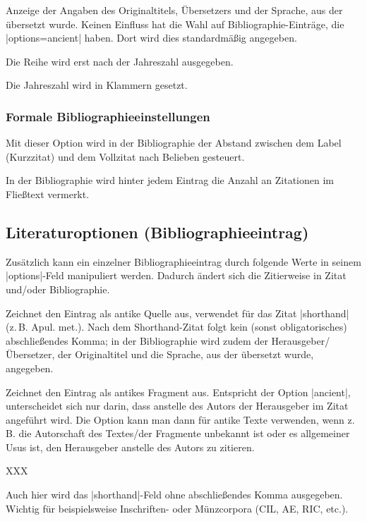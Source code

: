 \documentclass[a4paper,10pt,ngerman]{ltxdoc}
\begin{document}
  Anzeige der Angaben des Originaltitels, Übersetzers und der Sprache, aus der übersetzt wurde. 
Keinen Einfluss hat die Wahl auf Bibliographie-Einträge, die |options=ancient| haben. 
Dort wird dies standardmäßig angegeben.

  Die Reihe wird erst nach der Jahreszahl ausgegeben.
 
  Die Jahreszahl wird in Klammern gesetzt.

\subsubsection{Formale Bibliographieeinstellungen}

  Mit dieser Option wird in der Bibliographie der Abstand zwischen dem Label (Kurzzitat) und dem Vollzitat nach Belieben gesteuert.
 
  In der Bibliographie wird hinter jedem Eintrag die Anzahl an Zitationen im Fließtext vermerkt. 

\subsection{Literaturoptionen (Bibliographieeintrag)}\label{bib_options}
Zusätzlich kann ein einzelner Bibliographieeintrag durch folgende Werte in seinem |options|-Feld manipuliert werden. Dadurch ändert sich die Zitierweise in Zitat und/oder Bibliographie.

  Zeichnet den Eintrag als antike Quelle aus, verwendet für das Zitat |shorthand| (z.\,B. Apul. met.). Nach dem Shorthand-Zitat folgt kein (sonst obligatorisches) abschließendes Komma; in der Bibliographie wird zudem der Herausgeber/Übersetzer, der Originaltitel und die Sprache, aus der übersetzt wurde, angegeben.

  Zeichnet den Eintrag als antikes Fragment aus. Entspricht der Option |ancient|, unterscheidet sich nur darin, dass anstelle des Autors der Herausgeber im Zitat angeführt wird. Die Option kann man dann für antike Texte verwenden, wenn z.\,B. die Autorschaft des Textes/der Fragmente unbekannt ist oder es allgemeiner Usus ist, den Herausgeber anstelle des Autors zu zitieren.

  XXX

  Auch hier wird das |shorthand|-Feld ohne abschließendes Komma ausgegeben. 
Wichtig für beispielsweise Inschriften- oder Münzcorpora (CIL, AE, RIC, etc.). 
\end{document}
